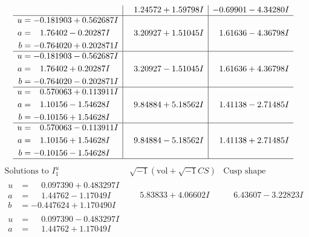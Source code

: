 \documentclass[1p]{elsarticle_modified}
\theoremstyle{definition}
\newcommand{\I}{\sqrt{-1}}
\begin{document}
$$\begin{array}{c|c|c}
 & \phantom{-}1.24572 + 1.59798 I & -0.69901 - 4.34280 I \\ \hline\begin{aligned}
u &= -0.181903 + 0.562687 I \\
a &= \phantom{-}1.76402 - 0.20287 I \\
b &= -0.764020 + 0.202871 I\end{aligned}
 & \phantom{-}3.20927 + 1.51045 I & \phantom{-}1.61636 - 4.36798 I \\ \hline\begin{aligned}
u &= -0.181903 - 0.562687 I \\
a &= \phantom{-}1.76402 + 0.20287 I \\
b &= -0.764020 - 0.202871 I\end{aligned}
 & \phantom{-}3.20927 - 1.51045 I & \phantom{-}1.61636 + 4.36798 I \\ \hline\begin{aligned}
u &= \phantom{-}0.570063 + 0.113911 I \\
a &= \phantom{-}1.10156 - 1.54628 I \\
b &= -0.10156 + 1.54628 I\end{aligned}
 & \phantom{-}9.84884 + 5.18562 I & \phantom{-}1.41138 - 2.71485 I \\ \hline\begin{aligned}
u &= \phantom{-}0.570063 - 0.113911 I \\
a &= \phantom{-}1.10156 + 1.54628 I \\
b &= -0.10156 - 1.54628 I\end{aligned}
 & \phantom{-}9.84884 - 5.18562 I & \phantom{-}1.41138 + 2.71485 I\\
 \hline 
 \end{array}$$\newpage$$\begin{array}{c|c|c}  
\text{Solutions to }I^u_{1}& \I (\text{vol} + \sqrt{-1}CS) & \text{Cusp shape}\\
 \hline 
\begin{aligned}
u &= \phantom{-}0.097390 + 0.483297 I \\
a &= \phantom{-}1.44762 - 1.17049 I \\
b &= -0.447624 + 1.170490 I\end{aligned}
 & \phantom{-}5.83833 + 4.06602 I & \phantom{-}6.43607 - 3.22823 I \\ \hline\begin{aligned}
u &= \phantom{-}0.097390 - 0.483297 I \\
a &= \phantom{-}1.44762 + 1.17049 I \\

\end{aligned}
\end{array}$$
\end{document}
